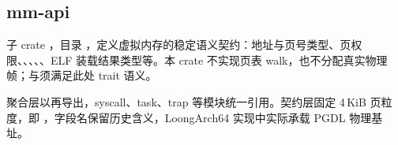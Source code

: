 
\subsection{mm-api}

子 crate ，目录 ，定义虚拟内存的稳定语义契约：地址与页号类型、页权限、、、、、ELF 装载结果类型等。本 crate 不实现页表 walk，也不分配真实物理帧；与须满足此处 trait 语义。

聚合层以再导出，syscall、task、trap 等模块统一引用。契约层固定 4\,KiB 页粒度，即 ，字段名保留历史含义，LoongArch64 实现中实际承载 PGDL 物理基址。


